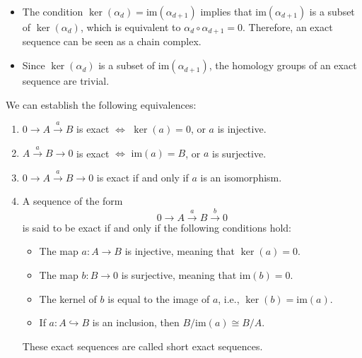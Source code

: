 \begin{remark}\noindent
	\begin{itemize}
		\item The condition \( \ker(\alpha_{d}) = \mathrm{im}(\alpha_{d+1}) \) implies that \( \mathrm{im}(\alpha_{d+1}) \) is a subset of \( \ker(\alpha_{d}) \), which is equivalent to \( \alpha_{d} \circ \alpha_{d+1} = 0 \). Therefore, an exact sequence can be seen as a chain complex.
		      		      		      
		\item Since \( \ker(\alpha_{d}) \) is a subset of \( \mathrm{im}(\alpha_{d+1}) \), the homology groups of an exact sequence are trivial.
	\end{itemize}
\end{remark}

\begin{proposition}{\cite[\S 1.3.1]{Weibel1994}}
	We can establish the following equivalences:
	\begin{enumerate}
		\item $0 \xrightarrow{}A \xrightarrow{a}B$ is exact $\Longleftrightarrow$ $\ker
		      (a) = 0$, or $a$ is injective.
		      		      		      
		\item $A \xrightarrow{a}B \rightarrow 0$ is exact $\Longleftrightarrow$ $\mathrm{im}
		      (a) = B$, or $a$ is surjective.
		      		      		      
		\item $0 \xrightarrow{}A \xrightarrow{a}B \rightarrow 0$ is exact if and only
		      if $a$ is an isomorphism.
		      		      		      
		\item A sequence of the form
		      \begin{equation}
		      	0 \xrightarrow{}A \xrightarrow{a}B \xrightarrow{b}0
		      \end{equation}
		      is said to be exact if and only if the following conditions hold:
		      \begin{itemize}
		      	\item The map $a: A \rightarrow B$ is injective, meaning that
		      	      $\ker(a) = 0$.
		      	      		      	      		      	      
		      	\item The map $b: B \rightarrow 0$ is surjective, meaning that
		      	      $\mathrm{im}(b) = 0$.
		      	      		      	      		      	      
		      	\item The kernel of $b$ is equal to the image of $a$, i.e.,
		      	      $\ker(b) = \mathrm{im}(a)$.
		      	      		      	      		      	      
		      	\item If $a: A \hookrightarrow B$ is an inclusion, then $B/\mathrm{im}(a) \cong B/A$.
		      \end{itemize}
		      These exact sequences are called short exact sequences.
	\end{enumerate}
\end{proposition}

